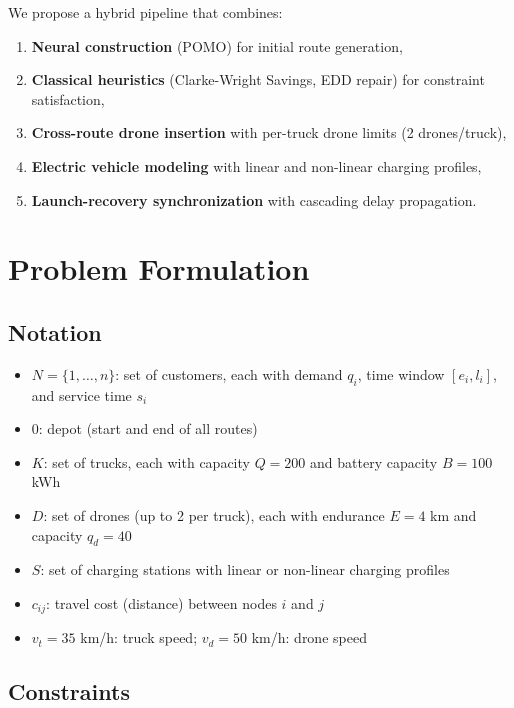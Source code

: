 \documentclass[11pt,a4paper]{article}
\begin{document}
We propose a hybrid pipeline that combines:
\begin{enumerate}
    \item \textbf{Neural construction} (POMO) for initial route generation,
    \item \textbf{Classical heuristics} (Clarke-Wright Savings, EDD repair) for
          constraint satisfaction,
    \item \textbf{Cross-route drone insertion} with per-truck drone limits (2 drones/truck),
    \item \textbf{Electric vehicle modeling} with linear and non-linear charging profiles,
    \item \textbf{Launch-recovery synchronization} with cascading delay propagation.
\end{enumerate}

\section{Problem Formulation}

\subsection{Notation}

\begin{itemize}
    \item $N = \{1, \ldots, n\}$: set of customers, each with demand $q_i$, time window
          $[e_i, l_i]$, and service time $s_i$
    \item $0$: depot (start and end of all routes)
    \item $K$: set of trucks, each with capacity $Q = 200$ and battery capacity
          $B = 100$ kWh
    \item $D$: set of drones (up to 2 per truck), each with endurance $E = 4$ km
          and capacity $q_d = 40$
    \item $S$: set of charging stations with linear or non-linear charging profiles
    \item $c_{ij}$: travel cost (distance) between nodes $i$ and $j$
    \item $v_t = 35$ km/h: truck speed; $v_d = 50$ km/h: drone speed
\end{itemize}

\subsection{Constraints}
\end{document}
